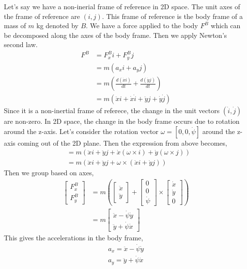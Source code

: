 \documentclass{article}
\begin{document}
\begin{tcolorbox}[title={Newton's laws in a non-inertial frame for reference.}]

Let's say we have a non-inerial frame of reference in 2D space. The unit axes of the frame of reference are $(i, j)$.
This frame of reference is the body frame of a mass of $m$ \unit{\kilogram} denoted by $B$. We have a force applied to
the body $F^B$ which can be decomposed along the axes of the body frame. Then we apply Newton's second law.
\begin{align}
    F^B
    &= F_x^Bi + F_y^Bj \\
    &= m(a_xi + a_yj) \\
    &= m(\frac{d(\dot{x}i)}{dt} + \frac{d(\dot{y}j)}{dt}) \\
    &= m(\ddot{x}i + \dot{x}\dot{i} + \ddot{y}j + \dot{y}\dot{j})
\end{align}
Since it is a non-inertial frame of referece, the change in the unit vectors $(\dot{i}, \dot{j})$ are non-zero. In 2D
space, the change in the body frame occurs due to rotation around the z-axis. Let's consider the rotation vector
$\omega = [0, 0, \dot{\psi}]$ around the z-axis coming out of the 2D plane. Then the expression from above becomes,
\begin{align}
    &= m(\ddot{x}i + \ddot{y}j + \dot{x}(\omega\times i) + \dot{y}(\omega\times j)) \\
    &= m(\ddot{x}i + \ddot{y}j + \omega\times(\dot{x}i + \dot{y}j))
\end{align}
Then we group based on axes,
\begin{align}
    \begin{bmatrix} F_x^B \\ F_y^B \end{bmatrix} &=
        m\left( \begin{bmatrix} \ddot{x} \\ \ddot{y} \end{bmatrix}
        + \begin{bmatrix} 0 \\ 0 \\ \dot{\psi} \end{bmatrix} \times
        \begin{bmatrix} \dot{x} \\ \dot{y} \\ 0 \end{bmatrix}
        \right) \\
    &= m\begin{bmatrix} \ddot{x} - \dot{\psi}\dot{y} \\ \ddot{y} + \dot{\psi}\dot{x} \end{bmatrix}
\end{align}
This gives the accelerations in the body frame,
\begin{align}
    a_x = \ddot{x} - \dot{\psi}\dot{y} \\
    a_y = \ddot{y} + \dot{\psi}\dot{x} \\
\end{align}


\end{tcolorbox}
\end{document}
